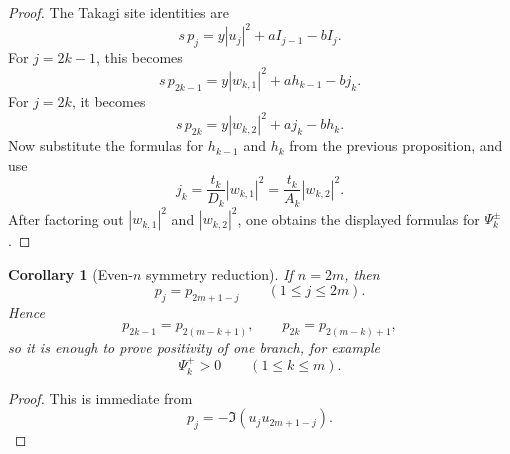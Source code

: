 \documentclass[11pt]{article}
\newtheorem{corollary}[theorem]{Corollary}
\begin{document}
\begin{proof}
The Takagi site identities are
\[
s\,p_j
=
y|u_j|^2+a I_{j-1}-b I_j.
\]
For \(j=2k-1\), this becomes
\[
s\,p_{2k-1}
=
y|w_{k,1}|^2+a h_{k-1}-b j_k.
\]
For \(j=2k\), it becomes
\[
s\,p_{2k}
=
y|w_{k,2}|^2+a j_k-b h_k.
\]
Now substitute the formulas for \(h_{k-1}\) and \(h_k\) from the previous proposition, and use
\[
j_k=\frac{t_k}{D_k}|w_{k,1}|^2=\frac{t_k}{A_k}|w_{k,2}|^2.
\]
After factoring out \(|w_{k,1}|^2\) and \(|w_{k,2}|^2\), one obtains the displayed formulas for
\(\Psi_k^\pm\).
\end{proof}

\begin{corollary}[Even-\(n\) symmetry reduction]
If \(n=2m\), then
\[
p_j=p_{2m+1-j}
\qquad (1\le j\le 2m).
\]
Hence
\[
p_{2k-1}=p_{2(m-k+1)},
\qquad
p_{2k}=p_{2(m-k)+1},
\]
so it is enough to prove positivity of one branch, for example
\[
\Psi_k^+>0
\qquad (1\le k\le m).
\]
\end{corollary}

\begin{proof}
This is immediate from
\[
p_j=-\Im(u_j u_{2m+1-j}).
\]
\end{proof}
\end{document}
